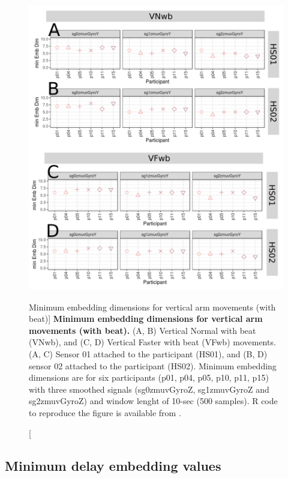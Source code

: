 \begin{figure}
\centering
\includegraphics[width=1.0\textwidth]{cao_Vwb_w10}
	\caption
	[Minimum embedding dimensions for vertical arm movements 
	(with beat)]{
	{\bf Minimum embedding dimensions for vertical arm movements 
	(with beat).} 
		(A, B) Vertical Normal with beat (VNwb), and
		(C, D) Vertical Faster with beat (VFwb) movements.
		(A, C) Sensor 01 attached to the participant (HS01), and
		(B, D) sensor 02 attached to the participant (HS02).
		Minimum embedding dimensions are for six participants 
		(p01, p04, p05, p10, p11, p15) with three smoothed signals 
		(sg0zmuvGyroZ, sg1zmuvGyroZ and sg2zmuvGyroZ)
		and window lenght of 10-sec (500 samples).
		R code to reproduce the figure is available 
		from \cite{xochicale2018}.
        }
    \label{fig:caoVwb}
\end{figure}






\newpage
\subsection{Minimum delay embedding values}

